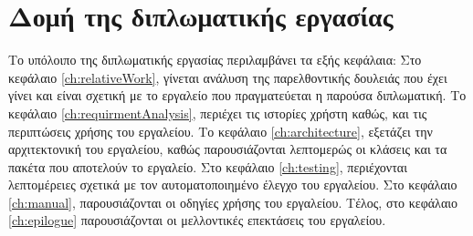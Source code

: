 \section{Δομή της διπλωματικής εργασίας}
\label{sec:Structure}
Το υπόλοιπο της  διπλωματικής  εργασίας  περιλαμβάνει τα εξής κεφάλαια:
Στο κεφάλαιο \ref{ch:relativeWork}, γίνεται ανάλυση της παρελθοντικής δουλειάς που έχει γίνει και είναι σχετική με
το εργαλείο που πραγματεύεται η παρούσα διπλωματική. Το κεφάλαιο \ref{ch:requirmentAnalysis}, περιέχει τις ιστορίες χρήστη
καθώς, και τις περιπτώσεις χρήσης του εργαλείου. 
Το κεφάλαιο \ref{ch:architecture}, εξετάζει την αρχιτεκτονική του εργαλείου, 
καθώς παρουσιάζονται λεπτομερώς οι κλάσεις και τα πακέτα που αποτελούν το εργαλείο. Στο κεφάλαιο \ref{ch:testing}, περιέχονται 
λεπτομέρειες σχετικά με τον αυτοματοποιημένο έλεγχο του εργαλείου. Στο κεφάλαιο \ref{ch:manual}, παρουσιάζονται 
οι οδηγίες χρήσης του εργαλείου. Τέλος, στο κεφάλαιο \ref{ch:epilogue} παρουσιάζονται οι μελλοντικές επεκτάσεις του εργαλείου.